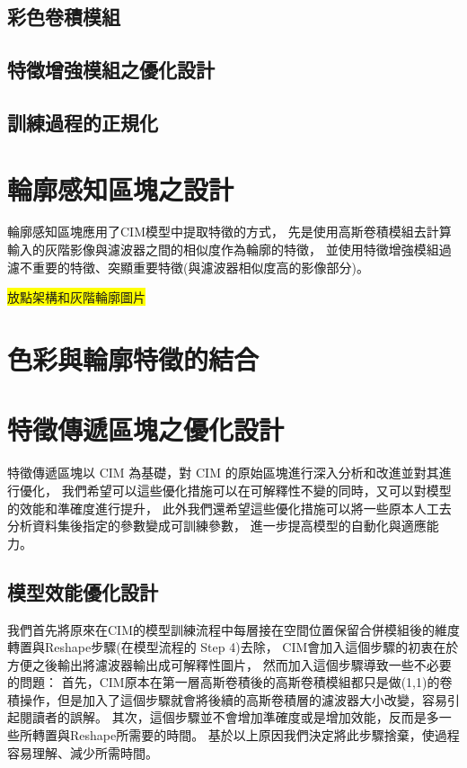 \documentclass[class=NCU_thesis, crop=false]{standalone}
\begin{document}
	\subsection{彩色卷積模組}

	\subsection{特徵增強模組之優化設計}

	\subsection{訓練過程的正規化}

\section{輪廓感知區塊之設計}
輪廓感知區塊應用了CIM模型中提取特徵的方式，
先是使用高斯卷積模組去計算輸入的灰階影像與濾波器之間的相似度作為輪廓的特徵，
並使用特徵增強模組過濾不重要的特徵、突顯重要特徵(與濾波器相似度高的影像部分)。

\colorbox {yellow}{放點架構和灰階輪廓圖片}

\section{色彩與輪廓特徵的結合}

\section{特徵傳遞區塊之優化設計}
特徵傳遞區塊以 CIM 為基礎，對 CIM 的原始區塊進行深入分析和改進並對其進行優化，
我們希望可以這些優化措施可以在可解釋性不變的同時，又可以對模型的效能和準確度進行提升，
此外我們還希望這些優化措施可以將一些原本人工去分析資料集後指定的參數變成可訓練參數，
進一步提高模型的自動化與適應能力。

	\subsection{模型效能優化設計}
	
	我們首先將原來在CIM的模型訓練流程中每層接在空間位置保留合併模組後的維度轉置與Reshape步驟(在\cite{YangCNNInterpretable}模型流程的 Step 4)去除，
	CIM會加入這個步驟的初衷在於方便之後輸出將濾波器輸出成可解釋性圖片，
	然而加入這個步驟導致一些不必要的問題：
	首先，CIM原本在第一層高斯卷積後的高斯卷積模組都只是做(1,1)的卷積操作，但是加入了這個步驟就會將後續的高斯卷積層的濾波器大小改變，容易引起閱讀者的誤解。
	其次，這個步驟並不會增加準確度或是增加效能，反而是多一些所轉置與Reshape所需要的時間。
	基於以上原因我們決定將此步驟捨棄，使過程容易理解、減少所需時間。
\end{document}

